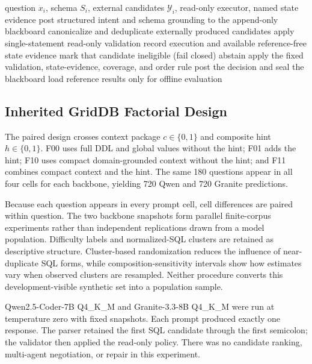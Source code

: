 \documentclass[applsci,article,submit,moreauthors]{Definitions/mdpi}
\begin{document}
\begin{algorithm}[htbp]
\caption{Gold-isolated deterministic coordination}
\label{alg:coordination}
\begin{algorithmic}[1]
\REQUIRE question $x_i$, schema $S_i$, external candidates $\mathcal{Y}_i$, read-only executor, named state evidence
\STATE post structured intent and schema grounding to the append-only blackboard
\STATE canonicalize and deduplicate externally produced candidates
  \STATE apply single-statement read-only validation
  \STATE record execution and available reference-free state evidence
\ENDFOR
{}
  \STATE mark that candidate ineligible (fail closed)
\ENDIF
{}
  \STATE abstain
\ELSE
  \STATE apply the fixed validation, state-evidence, coverage, and order rule
\ENDIF
\STATE post the decision and seal the blackboard
\STATE load reference results only for offline evaluation
\end{algorithmic}
\end{algorithm}

\subsection{Inherited GridDB Factorial Design}

The paired design crosses context package $c\in\{0,1\}$ and composite hint $h\in\{0,1\}$. F00 uses full DDL and global values without the hint; F01 adds the hint; F10 uses compact domain-grounded context without the hint; and F11 combines compact context and the hint. The same 180 questions appear in all four cells for each backbone, yielding 720 Qwen and 720 Granite predictions.

Because each question appears in every prompt cell, cell differences are paired within question. The two backbone snapshots form parallel finite-corpus experiments rather than independent replications drawn from a model population. Difficulty labels and normalized-SQL clusters are retained as descriptive structure. Cluster-based randomization reduces the influence of near-duplicate SQL forms, while composition-sensitivity intervals show how estimates vary when observed clusters are resampled. Neither procedure converts this development-visible synthetic set into a population sample.

Qwen2.5-Coder-7B Q4\_K\_M and Granite-3.3-8B Q4\_K\_M were run at temperature zero with fixed snapshots. Each prompt produced exactly one response. The parser retained the first SQL candidate through the first semicolon; the validator then applied the read-only policy. There was no candidate ranking, multi-agent negotiation, or repair in this experiment.
\end{document}
